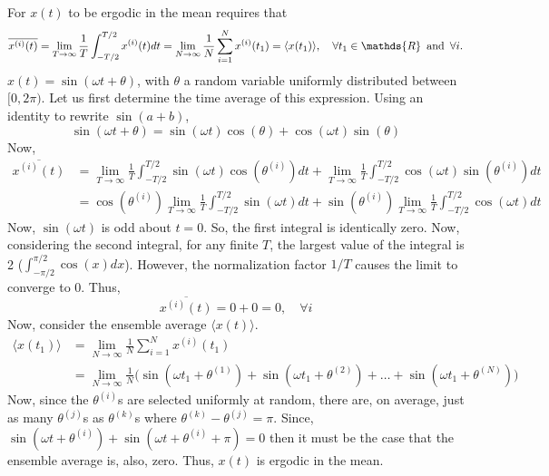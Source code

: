 \begin{homeworkProblem}
   For $ x(t) $ to be ergodic in the mean requires that
   \[
      \overline{x^{(i)}(t)} = \lim_{T \to \infty} \frac{1}{T}
      \int_{-T/2}^{T/2} x^{(i)}(t) dt =
      \lim_{N \to \infty} \frac{1}{N} \sum^{N}_{i=1} x^{(i)}(t_{1}) =
      \langle x(t_{1}) \rangle
      ,\quad\forall t_{1} \in \mathds{R} \enskip\text{and} \enskip\forall i.
   \]
   $ x(t) = \sin(\omega t + \theta) $, with $ \theta $ a random variable
   uniformly distributed between $ [0,2\pi) $. Let us first determine the time
   average of this expression. Using an identity to rewrite $ \sin(a+b) $,
   \[
      \sin(\omega t + \theta) = \sin(\omega t )\cos(\theta) +
      \cos(\omega t)\sin(\theta)
   \]
   Now,
   \begin{align*}
      \overline{x^{(i)}(t)} &=
      \lim_{T \to \infty} \frac{1}{T} \int_{-T/2}^{T/2} \sin(\omega t)
      \cos(\theta^{(i)}) dt +
      \lim_{T \to \infty} \frac{1}{T} \int_{-T/2}^{T/2} \cos(\omega t)
      \sin(\theta^{(i)}) dt \\
      &= \cos(\theta^{(i)})\lim_{T \to \infty} \frac{1}{T} \int_{-T/2}^{T/2}
      \sin(\omega t) dt +
      \sin(\theta^{(i)}) \lim_{T \to \infty} \frac{1}{T} \int_{-T/2}^{T/2} \cos(\omega t)
      dt
   \end{align*}
      Now, $ \sin(\omega t) $ is odd about $ t = 0 $. So, the first
      integral is identically zero. Now, considering the second integral, for
      any finite $ T $, the largest value of the
      integral is 2 ($ \int_{-\pi/2}^{\pi/2} \cos(x) dx $). However, the
      normalization factor $ 1/T $ causes the limit to converge to $ 0 $. Thus,
      \[
         \overline{x^{(i)}(t)} = 0 + 0 = 0,\quad \forall i
      \]
      Now, consider the ensemble average $ \langle x(t) \rangle $.
      \begin{align}
         \langle x(t_{1}) \rangle
         &= \lim_{N \to \infty} \frac{1}{N} \sum^{N}_{i=1}
         x^{(i)}(t_{1}) \\
         &= \lim_{N \to \infty} \frac{1}{N} \bigl(
         \sin(\omega t_1 + \theta^{(1)}) +
         \sin(\omega t_1 + \theta^{(2)}) +
      \ldots + \sin(\omega t_1 + \theta^{(N)}) \bigr)
      \end{align}
      Now, since the $ \theta^{(i)} $s are selected uniformly at random, there are,
      on average, just as many $ \theta^{(j)} $s as $ \theta^{(k)} $s where $
      \theta^{(k)} -
      \theta^{(j)} = \pi$. Since, $ \sin(\omega t + \theta^{(i)}) + \sin(\omega t +
      \theta^{(i)} + \pi) = 0 $ then it must be the case that the ensemble average
      is, also, zero. Thus, $ x(t) $ is ergodic in the mean.


\end{homeworkProblem}
